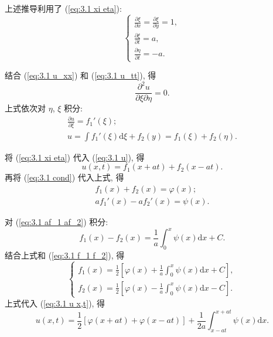 上述推导利用了 (\ref{eq:3.1 xi eta}):
\begin{equation}
    \begin{cases}
        \frac{\partial\xi}{\partial x}=\frac{\partial\xi}{\partial y}=1, \\
        \frac{\partial\xi}{\partial t}=a,                                \\
        \frac{\partial\eta}{\partial t}=-a.
    \end{cases}
\end{equation}

结合 (\ref{eq:3.1 u_xx}) 和 (\ref{eq:3.1 u_tt}), 得
\begin{equation}
    \frac{\partial^2 u}{\partial\xi\partial\eta}=0.
\end{equation}
上式依次对 $\eta$, $\xi$ 积分:
\begin{gather}
    \frac{\partial u}{\partial\xi}=f_1'(\xi); \\
    u=\int f_1'(\xi)\mathrm{d}\xi+f_2(y)=f_1(\xi)+f_2(\eta). \label{eq:3.1 u}
\end{gather}

将 (\ref{eq:3.1 xi eta}) 代入 (\ref{eq:3.1 u}), 得
\begin{equation} \label{eq:3.1 u x,t}
    u(x,t)=f_1(x+at)+f_2(x-at).
\end{equation}
再将 (\ref{eq:3.1 cond}) 代入上式, 得
\begin{gather}
    f_1(x)+f_2(x)=\varphi(x); \label{eq:3.1 f_1 f_2} \\
    af_1'(x)-af_2'(x)=\psi(x). \label{eq:3.1 af_1 af_2}
\end{gather}

对 (\ref{eq:3.1 af_1 af_2}) 积分:
\begin{equation}
    f_1(x)-f_2(x)=\frac{1}{a}\int_{0}^{x}\psi(x)\mathrm{d}x+C.
\end{equation}
结合上式和 (\ref{eq:3.1 f_1 f_2}), 得
\begin{equation}
    \begin{cases}
        f_1(x)=\frac{1}{2}\left[\varphi(x)+\frac{1}{a}\int_{0}^{x}\psi(x)\mathrm{d}x+C\right], \\
        f_2(x)=\frac{1}{2}\left[\varphi(x)-\frac{1}{a}\int_{0}^{x}\psi(x)\mathrm{d}x-C\right].
    \end{cases}
\end{equation}
上式代入 (\ref{eq:3.1 u x,t}), 得
\begin{equation} \label{eq:3.1 d'Alembert}
    u(x,t)=\frac{1}{2}[\varphi(x+at)+\varphi(x-at)]+\frac{1}{2a}\int_{x-at}^{x+at}\psi(x)\mathrm{d}x.
\end{equation}

